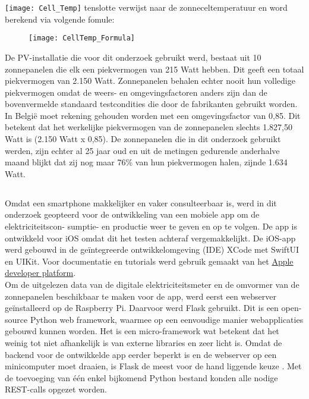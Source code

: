 \texttt{[image: Cell\_Temp]} tenslotte verwijst naar de zonneceltemperatuur en word berekend via volgende fomule:

\begin{figure}[h!]
    \centering\texttt{[image: CellTemp\_Formula]}
\end{figure} 

De PV-installatie die voor dit onderzoek gebruikt werd, bestaat uit 10 zonnepanelen die elk een piekvermogen van 215 Watt hebben. Dit geeft een totaal piekvermogen van 2.150 Watt. Zonnepanelen behalen echter nooit hun volledige piekvermogen omdat de weers- en omgevingsfactoren anders zijn dan de bovenvermelde standaard testcondities die door de fabrikanten gebruikt worden. In België moet rekening gehouden worden met een omgevingsfactor van 0,85. Dit betekent dat het werkelijke piekvermogen van de zonnepanelen slechts 1.827,50 Watt is (2.150 Watt x 0,85). De zonnepanelen die in dit onderzoek gebruikt werden, zijn echter al 25 jaar oud en uit de metingen gedurende anderhalve maand blijkt dat zij nog maar 76\% van hun piekvermogen halen, zijnde 1.634 Watt. \\

\newpage
\subsection{}%
\label{sec:Weergave uitgelezen data en voorspelling met een iOS app}

Omdat een smartphone makkelijker en vaker consulteerbaar is, werd in dit onderzoek geopteerd voor de ontwikkeling van een mobiele app om de elektriciteitscon- sumptie- en productie weer te geven en op te volgen. De app is ontwikkeld voor iOS omdat dit het testen achteraf vergemakkelijkt. De iOS-app werd gebouwd in de geïntegreerde ontwikkelomgeving (IDE) XCode met SwiftUI en UIKit. Voor documentatie en tutorials werd gebruik gemaakt van het \href{https://developer.apple.com/}{Apple developer platform}. \\

Om de uitgelezen data van de digitale elektriciteitsmeter en de omvormer van de zonnepanelen beschikbaar te maken voor de app, werd eerst een webserver geïnstalleerd op de Raspberry Pi. Daarvoor werd Flask gebruikt. Dit is een open-source Python web framework, waarmee op een eenvoudige manier webapplicaties gebouwd kunnen worden. Het is een micro-framework wat betekent dat het weinig tot niet afhankelijk is van externe libraries en zeer licht is. Omdat de backend voor de ontwikkelde app eerder beperkt is en de webserver op een minicomputer moet draaien, is Flask de meest voor de hand liggende keuze \autocite{Shokrzad2023}. Met de toevoeging van één enkel bijkomend Python bestand konden alle nodige REST-calls opgezet worden. 

